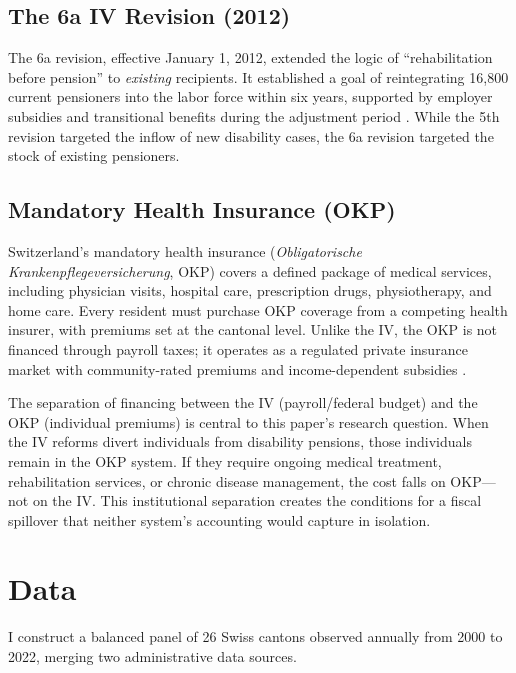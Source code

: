 \documentclass[12pt]{article}
\begin{document}
\subsection{The 6a IV Revision (2012)}

The 6a revision, effective January 1, 2012, extended the logic of ``rehabilitation before pension'' to \emph{existing} recipients. It established a goal of reintegrating 16,800 current pensioners into the labor force within six years, supported by employer subsidies and transitional benefits during the adjustment period \citep{bsv2017revision6a}. While the 5th revision targeted the inflow of new disability cases, the 6a revision targeted the stock of existing pensioners.

\subsection{Mandatory Health Insurance (OKP)}

Switzerland's mandatory health insurance (\textit{Obligatorische Krankenpflegeversicherung}, OKP) covers a defined package of medical services, including physician visits, hospital care, prescription drugs, physiotherapy, and home care. Every resident must purchase OKP coverage from a competing health insurer, with premiums set at the cantonal level. Unlike the IV, the OKP is not financed through payroll taxes; it operates as a regulated private insurance market with community-rated premiums and income-dependent subsidies \citep{oecd2011switzerland}.

The separation of financing between the IV (payroll/federal budget) and the OKP (individual premiums) is central to this paper's research question. When the IV reforms divert individuals from disability pensions, those individuals remain in the OKP system. If they require ongoing medical treatment, rehabilitation services, or chronic disease management, the cost falls on OKP---not on the IV. This institutional separation creates the conditions for a fiscal spillover that neither system's accounting would capture in isolation.


\section{Data}

I construct a balanced panel of 26 Swiss cantons observed annually from 2000 to 2022, merging two administrative data sources.
\end{document}
